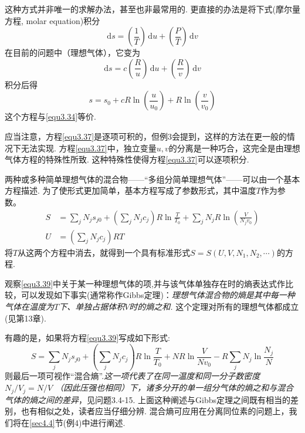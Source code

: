 这种方式并非唯一的求解办法，甚至也非最常用的. 更直接的办法是将下式(摩尔量方程, molar equation)积分
\begin{equation}
\label{equ3.36}
\text{d}s=\left(\frac{1}{T}\right)\,\text{d}u+\left(\frac{P}{T}\right)\,\text{d}v
\end{equation}
在目前的问题中（理想气体），它变为
\begin{equation}
\label{equ3.37}
\text{d}s=c\left(\frac{R}{u}\right)\,\text{d}u+\left(\frac{R}{v}\right)\,\text{d}v
\end{equation}
积分后得
\begin{equation}
\label{equ3.38}
s = s_0 + cR \ln \left( \frac{u}{u_0} \right) + R\ln \left( \frac{v}{v_0} \right)
\end{equation}
这个方程与\eqref{equ3.34}等价.

应当注意，方程\eqref{equ3.37}是逐项可积的，但例3会提到，这样的方法在更一般的情况下无法实现. 方程\eqref{equ3.37}中，独立变量$u,v$的分离是一种巧合，这完全是由理想气体方程的特殊性所致. 这种特殊性使得方程\eqref{equ3.37}可以逐项积分.

两种或多种简单理想气体的混合物——“多组分简单理想气体”——可以由一个基本方程描述. 为了使形式更加简单，基本方程写成了参数形式，其中温度$T$作为参数。
\begin{equation}
\label{equ3.39}
\begin{split}
    S &= \sum_j N_j s_{j0} + \left(\sum_j N_jc_j\right) R \ln \frac{T}{T_0} + \sum_j N_jR\ln\left(\frac{V}{N_jv_0}\right) \\
    U &= \left(\sum_jN_jc_j\right)RT
\end{split}
\end{equation}
将$T$从这两个方程中消去，就得到一个具有标准形式$S=S(U,V,N_1,N_2,\cdots)$的方程.

观察\eqref{equ3.39}中关于某一种理想气体的项,并与该气体单独存在时的熵表达式作比较，可以发现如下事实(通常称作Gibbs定理)：{\it 理想气体混合物的熵是其中每一种气体在温度为$T$下、单独占据体积$V$时的熵之和. }这个定理对所有的理想气体都成立(见第13章).

有趣的是，如果将方程\eqref{equ3.39}写成如下形式:
\begin{equation}
\label{equ3.40}
S=\sum_jN_js_{j0}+\left(\sum_jN_jc_{j}\right)R\ln{\frac{T}{T_0}}+NR\ln{\frac{V}{Nv_0}}-R\sum_jN_j\ln{\frac{N_j}{N}}
\end{equation}
则最后一项可视作“混合熵”.{\it 这一项代表了在同一温度和同一分子数密度$N_j/V_j = N/V$ （因此压强也相同）下，诸多分开的单一组分气体的熵之和与混合气体的熵之间的差异}，见问题3.4-15. 上面这种阐述与Gibbs定理之间既有相当的差别，也有相似之处，读者应当仔细分辨. 混合熵可应用在分离同位素的问题上，我们将在\ref{sec4.4}节(例4)中进行阐述.

